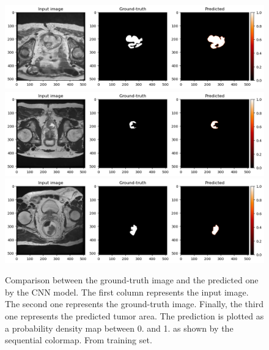 \documentclass{standalone}
\begin{document}
\begin{figure}[htp]

    \centering
    \includegraphics[width=\textwidth]{../images/predoutputr.png}
    \includegraphics[width=\textwidth]{../images/predoutputr1.png}
    \includegraphics[width=\textwidth]{../images/predoutputr2.png}

    \caption{Comparison between the ground-truth image and the predicted one by the CNN model. The first column represents the input image. 
    The second one represents the ground-truth image. 
    Finally, the third one represents the predicted tumor area.
    The prediction is plotted as a probability density map between 0. and 1. as shown by the sequential colormap.
    From training set.}\label{predtraining}


\end{figure}
\end{document}
